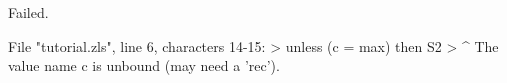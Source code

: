 \runverbatimfalse
{}
\begin{RunVerbatimMsg}
Failed.
\end{RunVerbatimMsg}
\begin{RunVerbatimErr}
File "tutorial.zls", line 6, characters 14-15:
>      unless (c = max) then S2
>              ^
The value name c is unbound (may need a 'rec').
\end{RunVerbatimErr}
